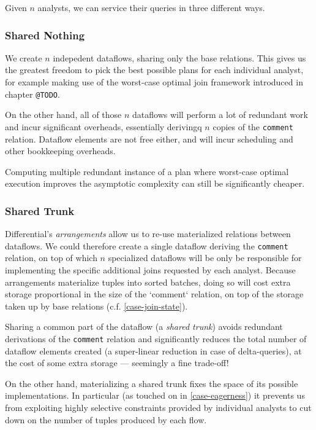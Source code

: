\documentclass[../catalog.tex]{subfiles}
\begin{document}
Given $n$ analysts, we can service their queries in three different
ways.

\subsubsection{Shared Nothing}

We create $n$ indepedent dataflows, sharing only the base
relations. This gives us the greatest freedom to pick the best
possible plans for each individual analyst, for example making use of
the worst-case optimal join framework introduced in chapter
\texttt{@TODO}.

On the other hand, all of those $n$ dataflows will perform a lot of
redundant work and incur significant overheads, essentially derivingq
$n$ copies of the \texttt{comment} relation. Dataflow elements are not
free either, and will incur scheduling and other bookkeeping
overheads.

Computing multiple redundant instance of a plan where worst-case
optimal execution improves the asymptotic complexity can still be
significantly cheaper.

\subsubsection{Shared Trunk}

Differential's \emph{arrangements} allow us to re-use materialized
relations between dataflows. We could therefore create a single
dataflow deriving the \texttt{comment} relation, on top of which $n$
specialized dataflows will be only be responsible for implementing the
specific additional joins requested by each analyst. Because
arrangements materialize tuples into sorted batches, doing so will
cost extra storage proportional in the size of the `comment` relation,
on top of the storage taken up by base relations
(c.f. \ref{case-join-state}).

Sharing a common part of the dataflow (a \emph{shared trunk}) avoids
redundant derivations of the \texttt{comment} relation and
significantly reduces the total number of dataflow elements created (a
super-linear reduction in case of delta-queries), at the cost of some
extra storage — seemingly a fine trade-off!

On the other hand, materializing a shared trunk fixes the space of its
possible implementations. In particular (as touched on in
\ref{case-eagerness}) it prevents us from exploiting highly selective
constraints provided by individual analysts to cut down on the number
of tuples produced by each flow.
\end{document}
